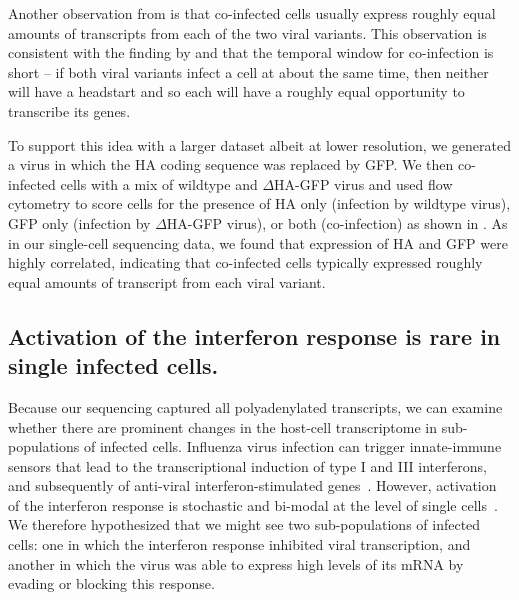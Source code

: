 \documentclass[9pt,lineno]{elife}
\providecommand{\DIFaddend}{} %
\begin{document}
\DIFaddend Another observation from  is that co-infected cells usually express roughly equal amounts of transcripts from each of the two viral variants.
This observation is consistent with the finding by \citet{Dou:2017cp} and \citet{Huang:2008gy} that the temporal window for co-infection is short -- if both viral variants infect a cell at about the same time, then neither will have a headstart and so each will have a roughly equal opportunity to transcribe its genes.

To support this idea with a larger dataset albeit at lower resolution, we generated a virus in which the HA coding sequence was replaced by GFP.
We then co-infected cells with a mix of wildtype and $\Delta$HA-GFP virus and used flow cytometry to score cells for the presence of HA only (infection by wildtype virus), GFP only (infection by $\Delta$HA-GFP virus), or both (co-infection) as shown in .
As in our single-cell sequencing data, we found that expression of HA and GFP were highly correlated, indicating that co-infected cells typically expressed roughly equal amounts of transcript from each viral variant.

\subsection{Activation of the interferon response is rare in single infected cells.}
Because our sequencing captured all polyadenylated transcripts, we can examine whether there are prominent changes in the host-cell transcriptome in sub-populations of infected cells.
Influenza virus infection can trigger innate-immune sensors that lead to the transcriptional induction of type I and III interferons, and subsequently of anti-viral interferon-stimulated genes~\citep{Killip:2015dw,Iwasaki:2014dw,crotta2013type}.
However, activation of the interferon response is stochastic and bi-modal at the level of single cells~\citep{Chen:2010cr,shalek2013single,shalek2014single,PerezCidoncha:2014jr,bhushal2017cell,hagai2017gene}.
We therefore hypothesized that we might see two sub-populations of infected cells: one in which the interferon response inhibited viral transcription, and another in which the virus was able to express high levels of its mRNA by evading or blocking this response.
\end{document}
